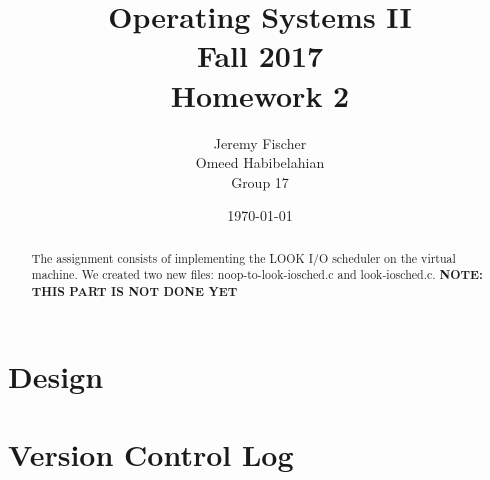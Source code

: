 \documentclass[draftclsnofoot, onecolumn, 10pt, compsoc]{IEEEtran}
\title{\textbf{Operating Systems II}\\Fall 2017\\Homework 2}
\author{Jeremy Fischer\\Omeed Habibelahian\\Group 17}
\date{\today}
\begin{document}
	\maketitle
	\begin{abstract}
		The assignment consists of implementing the LOOK I/O scheduler on the virtual machine. We created two new files: noop-to-look-iosched.c and look-iosched.c. \textbf{NOTE: THIS PART IS NOT DONE YET}
	\end{abstract}
	\newpage

	\section{Design}

	\section{Version Control Log}
\end{document}
